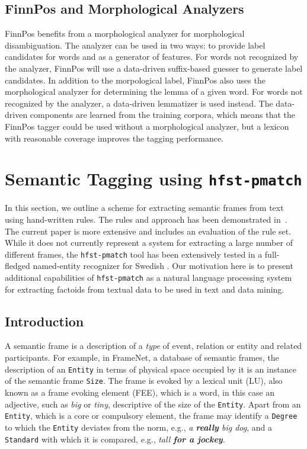 \documentclass{llncs}
\begin{document}
\subsection{FinnPos and Morphological Analyzers}

FinnPos benefits from a morphological analyzer for morphological disambiguation. 
The analyzer can be used in two ways: to provide label candidates for words 
and as a generator of features. For words not recognized by the analyzer, 
FinnPos will use a data-driven suffix-based guesser to generate label candidates.
In addition to the morpological label, FinnPos also uses the
morphological analyzer for determining the lemma of a given word. For
words not recognized by the analyzer, a data-driven lemmatizer is used
instead. The data-driven components are learned from the training corpora, which means
that the FinnPos tagger could be used without a morphological analyzer, 
but a lexicon with reasonable coverage improves the tagging performance.

\section{Semantic Tagging using {\tt hfst-pmatch}}\label{sec:sem-tagging}

In this section, we outline a scheme for extracting semantic frames from text
using hand-written rules. The rules and approach has been demonstrated in~\cite{hardwick/2015}. 
The current paper is more extensive and includes an evaluation of the rule set. While it does not currently 
represent a system for extracting a large number of different frames, 
the \verb+hfst-pmatch+ tool has been extensively tested in a full-fledged 
named-entity recognizer for Swedish \cite{Kokkinakis-Dimitrios2014-3}. 
Our motivation here is to present additional capabilities of 
\verb+hfst-pmatch+ as a natural language processing system for extracting 
factoids from textual data to be used in text and data mining.

\subsection{Introduction}

A semantic frame \cite{semantic-frame} is a description of a \emph{type} of event, relation or entity
and related participants. For example, in FrameNet, a database of semantic frames,
the description of an \verb+Entity+ in terms of physical space occupied by it is
an instance of the semantic frame \verb+Size+. The frame is evoked by
a lexical unit (LU), also known as a frame evoking element (FEE), which is a
word, in this case an adjective,
such as \emph{big} or \emph{tiny}, descriptive of the size of the \verb+Entity+.
Apart from an \verb+Entity+, which is a core or compulsory element, the
frame may identify a \verb+Degree+ to which the \verb+Entity+ deviates
from the norm, e.g., \emph{a \textbf{really} big dog}, and a \verb+Standard+ with
which it is compared, e.g., \emph{tall \textbf{for a jockey}}.
\end{document}
